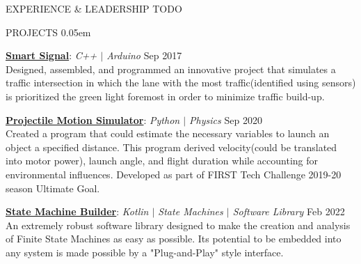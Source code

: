 \documentclass{resume} %
\begin{document}
    \vspace{-0.8em}
    \begin{rSection}{EXPERIENCE \& LEADERSHIP}
        TODO
    \end{rSection}
    
    \vspace{-0.8em}
    \begin{rSection}{PROJECTS}
        \vspace{-1.0em}
        \itemsep 0.05em {} 
        \item \underline{\textbf{Smart Signal}}: \textit{C++ $\vert$ Arduino} \hfill {Sep 2017}\vspace{0.25em} \\
        {Designed, assembled, and programmed an innovative project that simulates a traffic intersection in which the lane with the most traffic(identified using sensors) is prioritized the green light foremost in order to minimize traffic build-up.}

        \item \underline{\textbf{Projectile Motion Simulator}}: \textit{Python $\vert$ Physics} \hfill {Sep 2020}\vspace{0.25em} \\
        {Created a program that could estimate the necessary variables to launch an object a specified distance. This program derived velocity(could be translated into motor power), launch angle, and flight duration while accounting for environmental influences. Developed as part of FIRST Tech Challenge 2019-20 season Ultimate Goal.}

        \item \underline{\textbf{State Machine Builder}}: \textit{Kotlin $\vert$ State Machines $\vert$ Software Library} \hfill {Feb 2022}\vspace{0.25em} \\
        {An extremely robust software library designed to make the creation and analysis of Finite State Machines as easy as possible. Its potential to be embedded into any system is made possible by a "Plug-and-Play" style interface.}


\end{rSection}
\end{document}
